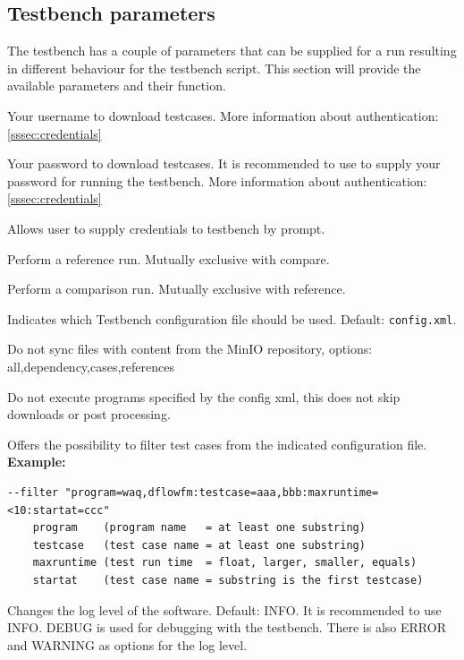 \documentclass{deltares_memo}
\begin{document}
\subsection{Testbench parameters}
\label{ssec:cmdparam}
The testbench has a couple of parameters that can be supplied for a run resulting in different behaviour for the testbench script.
This section will provide the available parameters and their function.
\begin{guilist}
\item[\texttt{-{}-username}] Your username to download testcases. More information about authentication: \autoref{sssec:credentials}

\item[\texttt{-{}-password}] Your password to download testcases. It is recommended to use  to supply your password for running the testbench. More information about authentication: \autoref{sssec:credentials}

\item[\texttt{-{}-interactive, -i}] Allows user to supply credentials to testbench by prompt.
\newline

\item[\texttt{-{}-reference, -r}] Perform a reference run. Mutually exclusive with compare.

\item[\texttt{-{}-compare, -c}] Perform a comparison run. Mutually exclusive with reference.

\item[\texttt{-{}-config}] Indicates which Testbench configuration file should be used. Default: \texttt{config.xml}.

\item[\texttt{-{}-skip-download}] Do not sync files with content from the MinIO repository, options: all,dependency,cases,references

\item[\texttt{-{}-skip-run}] Do not execute programs specified by the config xml, this does not skip downloads or post processing.

\item[\texttt{-{}-filter}] Offers the possibility to filter test cases from the indicated configuration file.
\newline
%
\textbf{Example:}
%
\begin{Verbatim}
--filter "program=waq,dflowfm:testcase=aaa,bbb:maxruntime=<10:startat=ccc"
    program    (program name   = at least one substring)
    testcase   (test case name = at least one substring)
    maxruntime (test run time  = float, larger, smaller, equals)
    startat    (test case name = substring is the first testcase)
\end{Verbatim}
\item[\texttt{-{}-log-level}] Changes the log level of the software. Default: INFO. It is recommended to use INFO. DEBUG is used for debugging with the testbench. There is also ERROR and WARNING as options for the log level.


\end{guilist}
\end{document}
